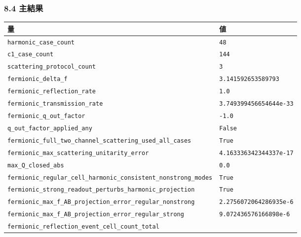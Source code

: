 \documentclass[
]{article}
\newcounter{none} %
\begin{document}
\subsubsection{8.4 主結果}\label{ux4e3bux7d50ux679c-6}

{\def\LTcaptype{none} %
\begin{longtable}[]{@{}
  >{\raggedright\arraybackslash}p{}
  >{\raggedleft\arraybackslash}p{}@{}}
\toprule\noalign{}
\begin{minipage}[b]{\linewidth}\raggedright
量
\end{minipage} & \begin{minipage}[b]{\linewidth}\raggedleft
値
\end{minipage} \\
\midrule\noalign{}
\endhead
\bottomrule\noalign{}
\endlastfoot
\texttt{harmonic\_case\_count} & \texttt{48} \\
\texttt{c1\_case\_count} & \texttt{144} \\
\texttt{scattering\_protocol\_count} & \texttt{3} \\
\texttt{fermionic\_delta\_f} & \texttt{3.141592653589793} \\
\texttt{fermionic\_reflection\_rate} & \texttt{1.0} \\
\texttt{fermionic\_transmission\_rate} &
\texttt{3.749399456654644e-33} \\
\texttt{fermionic\_q\_out\_factor} & \texttt{-1.0} \\
\texttt{q\_out\_factor\_applied\_any} & \texttt{False} \\
\texttt{fermionic\_full\_two\_channel\_scattering\_used\_all\_cases} &
\texttt{True} \\
\texttt{fermionic\_max\_scattering\_unitarity\_error} &
\texttt{4.163336342344337e-17} \\
\texttt{max\_Q\_closed\_abs} & \texttt{0.0} \\
\texttt{fermionic\_regular\_cell\_harmonic\_consistent\_nonstrong\_modes}
& \texttt{True} \\
\texttt{fermionic\_strong\_readout\_perturbs\_harmonic\_projection} &
\texttt{True} \\
\texttt{fermionic\_max\_f\_AB\_projection\_error\_regular\_nonstrong} &
\texttt{2.2756072064286935e-6} \\
\texttt{fermionic\_max\_f\_AB\_projection\_error\_regular\_strong} &
\texttt{9.072436576166898e-6} \\
\texttt{fermionic\_reflection\_event\_cell\_count\_total} &

\end{longtable}}
\end{document}

